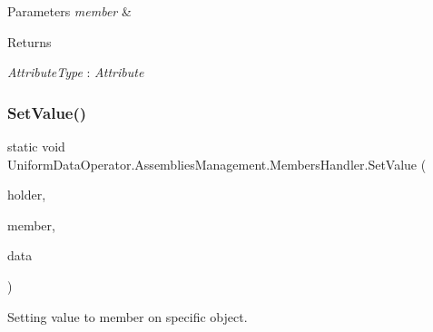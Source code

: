 \begin{DoxyParams}{Parameters}
{\em member} & \\
\hline
\end{DoxyParams}
\begin{DoxyReturn}{Returns}

\end{DoxyReturn}
\begin{Desc}
\item[Type Constraints]\begin{description}
\item[{\em Attribute\+Type} : {\em Attribute}]\end{description}
\end{Desc}
\mbox{\label{class_uniform_data_operator_1_1_assemblies_management_1_1_members_handler_a78639bd006a0e62b40abc26043f63c5b}} 
\subsubsection{\texorpdfstring{Set\+Value()}{SetValue()}}
{\footnotesize\ttfamily static void Uniform\+Data\+Operator.\+Assemblies\+Management.\+Members\+Handler.\+Set\+Value (\begin{DoxyParamCaption}\item[{object}]{holder,  }\item[{Member\+Info}]{member,  }\item[{object}]{data }\end{DoxyParamCaption})\hspace{0.3cm}{\ttfamily [static]}}



Setting value to member on specific object. 


